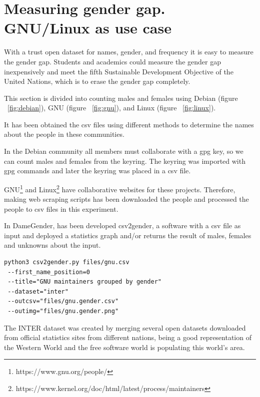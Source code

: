 \documentclass[a4paper]{article}
\begin{document}
\section{Measuring gender gap. GNU/Linux as use case}
\label{sec:measuring}

With a trust open dataset for names, gender, and frequency it is
easy to measure the gender gap. Students and academics could
measure the gender gap inexpensively and meet the fifth
Sustainable Development Objective of the United Nations,
which is to erase the gender gap completely. 

This section is divided into counting males and females using
Debian (figure ~\ref{fig:debian}), GNU (figure ~\ref{fig:gnu}),
and Linux (figure ~\ref{fig:linux}).

It has been obtained the csv files using different methods
to determine the names about the people in these communities.

In the Debian community all members must collaborate with
a gpg key, so we can count males and females from the keyring.
The keyring was imported with gpg commands and later 
the keyring was placed in a csv file.

GNU\footnote{https://www.gnu.org/people/} and
Linux\footnote{https://www.kernel.org/doc/html/latest/process/maintainers}
have collaborative websites for these projects. Therefore, making web
scraping scripts has been downloaded the people and processed
the people to csv files in this experiment.

In DameGender, has been developed csv2gender, a software with a csv
file as input and deployed a statistics graph and/or returns the result
of males, females and unknowns about the input.

\begin{verbatim}
python3 csv2gender.py files/gnu.csv
 --first_name_position=0
 --title="GNU maintainers grouped by gender"
 --dataset="inter"
 --outcsv="files/gnu.gender.csv"
 --outimg="files/gnu.gender.png"
\end{verbatim}


The INTER dataset was created by merging several open datasets
downloaded from official statistics sites from different nations,
being a good representation of the Western World and the free
software world is populating this world's area\cite{gonzalez2008geographic}.
\end{document}
